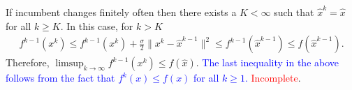 \documentclass[11pt]{article}
\begin{document}
If incumbent changes finitely often then there exists a $K < \infty$ such that $\hat{x}^k = \hat{x}$ for all $k \geq K$. In this case, for $k > K$
\begin{align*}
    f^{k-1}(x^k) \leq f^{k-1}(x^k) + \frac{\sigma}{2}\|x^k - \hat{x}^{k-1}\|^2 \leq f^{k-1}(\hat{x}^{k-1}) \leq f(\hat{x}^{k-1}).
\end{align*}
Therefore, $\limsup_{k\rightarrow \infty} f^{k-1}(x^k) \leq f(\hat{x})$. \textcolor{blue}{The last inequality in the above follows from the fact that $f^k(x) \leq f(x)$ for all $k \geq 1$.}
\textcolor{red}{Incomplete}.


\end{document}
